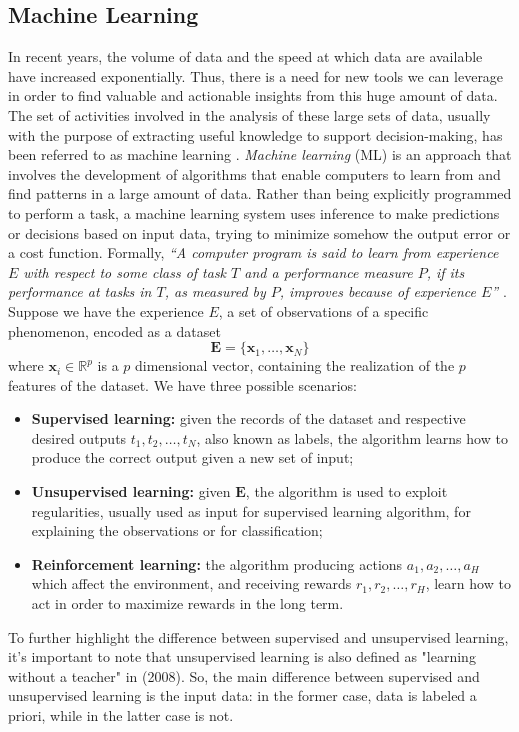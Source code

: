 \subsection{Machine Learning}
\label{subsec:ml}
In recent years, the volume of data and the speed at which data are available have increased exponentially. Thus, there is a need for new tools we can leverage in order to find valuable and actionable insights from this huge amount of data. The set of activities involved in the analysis of these large sets of data, usually with the purpose of extracting useful knowledge to support decision-making, has been referred to as machine learning \cite{vercellis_business_2009}. \emph{Machine learning} (ML) is an approach that involves the development of algorithms that enable computers to learn from and find patterns in a large amount of data. Rather than being explicitly programmed to perform a task, a machine learning system uses inference to make predictions or decisions based on input data, trying to minimize somehow the output error or a cost function. Formally, \textit{“A computer program is said to learn from experience $E$ with respect to some class of task $T$ and a performance measure $P$, if its performance at tasks in $T$, as measured by $P$, improves because of experience $E$”} \cite{zaki_data_2020, pierluca_lanzi_data_2021}. Suppose we have the experience $E$, a set of observations of a specific phenomenon, encoded as a dataset
\begin{equation}
    \label{eq:dataset}
    \mathbf{E}=\{\mathbf{x}_1, \dots, \mathbf{x}_N\} 
\end{equation}
where $\mathbf{x}_i\in \mathbb{R}^p$ is a $p$ dimensional vector, containing the realization of the $p$ features of the dataset. We have three possible scenarios:
\begin{itemize}
    \item \textbf{Supervised learning:} given the records of the dataset and respective desired outputs $t_1, t_2, \dots, t_N$, also known as labels, the algorithm learns how to produce the correct output given a new set of input;
    \item \textbf{Unsupervised learning:} given $\mathbf{E}$, the algorithm is used to exploit regularities, usually used as input for supervised learning algorithm, for explaining the observations or for classification;
    \item \textbf{Reinforcement learning:} the algorithm producing actions $a_1, a_2, \dots, a_H$ which affect the environment, and receiving rewards $r_1, r_2, \dots, r_H$, learn how to act in order to maximize rewards in the long term.
\end{itemize}
To further highlight the difference between supervised and unsupervised learning, it's important to note that unsupervised learning is also defined as "learning without a teacher" in \citeauthor{tibshirani_elements_2008} (2008). So, the main difference between supervised and unsupervised learning is the input data: in the former case, data is labeled a priori, while in the latter case is not. 

